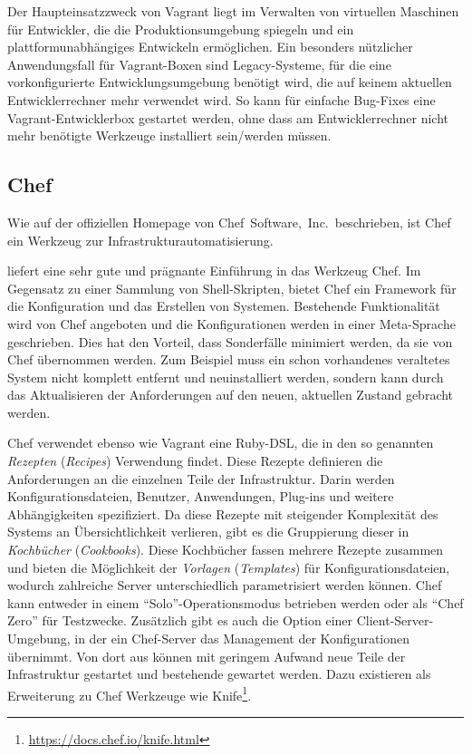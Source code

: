 Der Haupteinsatzzweck von Vagrant liegt im Verwalten von virtuellen Maschinen für Entwickler, die die Produktionsumgebung spiegeln und ein plattformunabhängiges Entwickeln ermöglichen.
Ein besonders nützlicher Anwendungsfall für Vagrant-Boxen sind Legacy-Systeme, für die eine vorkonfigurierte Entwicklungsumgebung benötigt wird, die auf keinem aktuellen Entwicklerrechner mehr verwendet wird.
So kann für einfache Bug-Fixes eine Vagrant-Entwicklerbox gestartet werden, ohne dass am Entwicklerrechner nicht mehr benötigte Werkzeuge installiert sein/werden müssen.


\subsection{Chef}
\label{sub:chef}
Wie auf der offiziellen Homepage \autocite{Chef:online} von Chef~Software,~Inc.\ beschrieben, ist Chef ein Werkzeug zur Infrastrukturautomatisierung.

\autocite{Wolff201604} liefert eine sehr gute und prägnante Einführung in das Werkzeug Chef.
Im Gegensatz zu einer Sammlung von Shell-Skripten, bietet Chef ein Framework für die Konfiguration und das Erstellen von Systemen.
Bestehende Funktionalität wird von Chef angeboten und die Konfigurationen werden in einer Meta-Sprache geschrieben.
Dies hat den Vorteil, dass Sonderfälle minimiert werden, da sie von Chef übernommen werden. Zum Beispiel muss ein schon vorhandenes veraltetes System nicht komplett entfernt und neuinstalliert werden, sondern kann durch das Aktualisieren der Anforderungen auf den neuen, aktuellen Zustand gebracht werden.

Chef verwendet ebenso wie Vagrant eine Ruby-DSL, die in den so genannten \emph{Rezepten} (\emph{Recipes}) Verwendung findet.
Diese Rezepte definieren die Anforderungen an die einzelnen Teile der Infrastruktur. Darin werden Konfigurationsdateien, Benutzer, Anwendungen, Plug-ins und weitere Abhängigkeiten spezifiziert.
Da diese Rezepte mit steigender Komplexität des Systems an Übersichtlichkeit verlieren, gibt es die Gruppierung dieser in \emph{Kochbücher} (\emph{Cookbooks}).
Diese Kochbücher fassen mehrere Rezepte zusammen und bieten die Möglichkeit der \emph{Vorlagen} (\emph{Templates}) für Konfigurationsdateien, wodurch zahlreiche Server unterschiedlich parametrisiert werden können.
Chef kann entweder in einem "`Solo"'-Operationsmodus betrieben werden oder als "`Chef Zero"' für Testzwecke. Zusätzlich gibt es auch die Option einer Client-Server-Umgebung, in der ein Chef-Server das Management der Konfigurationen übernimmt.
Von dort aus können mit geringem Aufwand neue Teile der Infrastruktur gestartet und bestehende gewartet werden. Dazu existieren als Erweiterung zu Chef Werkzeuge wie Knife\footnote{\url{https://docs.chef.io/knife.html}}.

